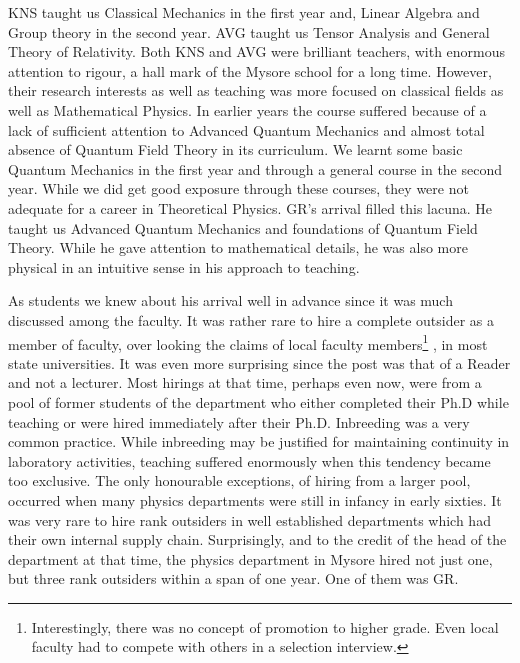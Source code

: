 KNS taught us Classical Mechanics in the first year and, Linear Algebra and Group theory in the second year. AVG taught us Tensor Analysis and General Theory of Relativity. Both KNS and AVG were brilliant teachers, with enormous attention to rigour, a hall mark of the Mysore school for a long time. However, their research interests as well as teaching was more focused on classical fields as well as Mathematical Physics. In earlier years the course suffered because of a lack of sufficient attention to Advanced Quantum Mechanics and almost total absence of Quantum Field Theory in its curriculum. We learnt some basic Quantum Mechanics in the first year and through a general course in the second year. While we did get good exposure through these courses, they were not adequate for a career in Theoretical Physics. GR’s arrival filled this lacuna. He taught us Advanced Quantum Mechanics and foundations of Quantum Field Theory. While he gave attention to mathematical details, he was also more physical in an intuitive sense in his approach to teaching.

As students we knew about his arrival well in advance since it was much discussed among the faculty. It was rather rare to hire a complete outsider as a member of faculty, over looking the claims of local faculty members\footnote{Interestingly, there was no concept of promotion to higher grade. Even local faculty had to compete with others in a selection interview.} , in most state universities. It was even more surprising since the post was that of a Reader and not a lecturer. Most hirings at that time, perhaps even now, were from a pool of former students of the department who either completed their Ph.D while teaching or were hired immediately after their Ph.D. Inbreeding was a very common practice. While inbreeding may be justified for maintaining continuity in laboratory activities, teaching suffered enormously when this tendency became too exclusive. The only honourable exceptions, of hiring from a larger pool, occurred when many physics departments were still in infancy in early sixties. It was very rare to hire rank outsiders in well established departments which had their own internal supply chain. Surprisingly, and to the credit of the head of the department at that time, the physics department in Mysore hired not just one, but three rank outsiders within a span of one year. One of them was GR.


